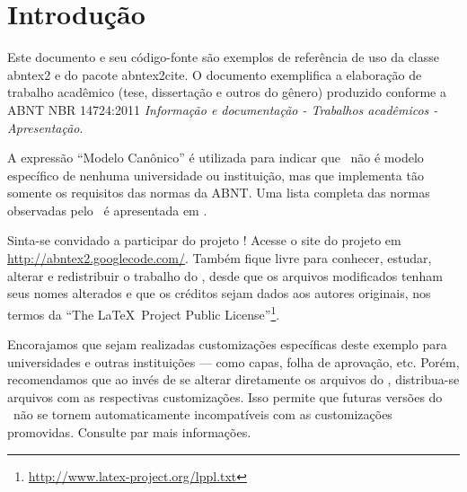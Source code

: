 \documentclass[
    12pt,				%
    openright,			%
    twoside,			%
    a4paper,			%
    english,			%
    french,				%
    spanish,			%
    brazil				%
    ]{abntex2}
\begin{document}
\tableofcontents*
\cleardoublepage



\textual

\chapter*[Introdução]{Introdução}

Este documento e seu código-fonte são exemplos de referência de uso da classe
\textsf{abntex2} e do pacote \textsf{abntex2cite}. O documento 
exemplifica a elaboração de trabalho acadêmico (tese, dissertação e outros do
gênero) produzido conforme a ABNT NBR 14724:2011 \emph{Informação e documentação
- Trabalhos acadêmicos - Apresentação}.

A expressão ``Modelo Canônico'' é utilizada para indicar que \abnTeX\ não é
modelo específico de nenhuma universidade ou instituição, mas que implementa tão
somente os requisitos das normas da ABNT. Uma lista completa das normas
observadas pelo \abnTeX\ é apresentada em .

Sinta-se convidado a participar do projeto \abnTeX! Acesse o site do projeto em
\url{http://abntex2.googlecode.com/}. Também fique livre para conhecer,
estudar, alterar e redistribuir o trabalho do \abnTeX, desde que os arquivos
modificados tenham seus nomes alterados e que os créditos sejam dados aos
autores originais, nos termos da ``The \LaTeX\ Project Public
License''\footnote{\url{http://www.latex-project.org/lppl.txt}}.

Encorajamos que sejam realizadas customizações específicas deste exemplo para
universidades e outras instituições --- como capas, folha de aprovação, etc.
Porém, recomendamos que ao invés de se alterar diretamente os arquivos do
\abnTeX, distribua-se arquivos com as respectivas customizações.
Isso permite que futuras versões do \abnTeX~não se tornem automaticamente
incompatíveis com as customizações promovidas. Consulte
 par mais informações.
\end{document}
